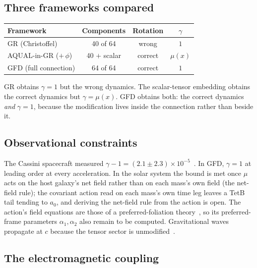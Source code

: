 \documentclass[11pt]{article}
\begin{document}
\subsection*{Three frameworks compared}

\begin{center}
\renewcommand{\arraystretch}{1.3}
\begin{tabular}{lccc}
\hline
  Framework & Components & Rotation & $\gamma$ \\
\hline
GR (Christoffel)
  & 40 of 64 & wrong & $1$ \\
AQUAL-in-GR ($+\,\phi$)
  & 40 $+$ scalar & correct & $\mu(x)$ \\
GFD (full connection)
  & 64 of 64 & correct & $1$ \\
\hline
\end{tabular}
\end{center}

\noindent GR obtains $\gamma = 1$ but the wrong dynamics.
The scalar-tensor embedding obtains the correct dynamics
but $\gamma = \mu(x)$.  GFD obtains both: the correct
dynamics \textit{and} $\gamma = 1$, because the
modification lives inside the connection rather than
beside it.

\subsection*{Observational constraints}

The Cassini spacecraft measured
$\gamma - 1 = (2.1 \pm 2.3) \times
10^{-5}$~\cite{Bertotti2003}.  In GFD, $\gamma = 1$ at leading
order at every acceleration. In the solar system the bound
is met once $\mu$ acts on the host galaxy's net field rather
than on each mass's own field (the net-field rule); the
covariant action read on each mass's own time leg leaves a
TetB tail tending to $a_0$, and deriving the net-field rule
from the action is open. The action's field equations are
those of a preferred-foliation theory~\cite{BlanchetMarsat2011},
so its preferred-frame parameters $\alpha_1, \alpha_2$ also
remain to be computed.
Gravitational waves propagate at $c$ because the tensor
sector is unmodified~\cite{Abbott2017}.

\subsection*{The electromagnetic coupling}
\end{document}
